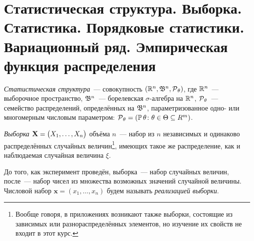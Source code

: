 \section{Статистическая структура. Выборка. Статистика. Порядковые статистики. Вариационный ряд. Эмпирическая функция распределения}

\begin{defn}
    \textit{Статистическая структура}~--- совокупность $(\mathbb{R}^n, \mathfrak{B}^n, \operatorname{\mathcal{P}}_\theta)$, 
    где $\mathbb{R}^n$~--- выборочное пространство, 
    $\mathfrak{B}^{n}$~--- борелевская $\sigma$-алгебра на $\mathbb{R}^n$, $\operatorname{\mathcal{P}}_\theta$~--- семейство распределений, 
    определённых на $\mathfrak{B}^n$, параметризованное одно- или многомерным числовым параметром: 
    $\operatorname{\mathcal{P}}_\theta = (\operatorname{\mathbb{P}}{\theta} \colon \theta \in \Theta \subseteq R^{m})$.
\end{defn}

\begin{defn}
    \textit{Выборка} $\mathbf{X}= \bigl(X_1, \ldots, X_n \bigr)$ объёма $n$~--- набор из $n$ независимых и одинаково распределённых случайных величин\footnote{Вообще говоря, в приложениях возникают также выборки, состоящие из зависимых или разнораспределённых элементов, но изучение их свойств не входит в этот курс.}, имеющих такое же распределение, как и наблюдаемая случайная величина $\xi$.
\end{defn}

До того, как эксперимент проведён, выборка~--- набор случайных величин, после~--- набор чисел из множества возможных значений случайной величины. 
Числовой набор $\boldsymbol{x} = (x_1, \ldots, x_n)$ будем называть \textit{реализацией выборки}.


